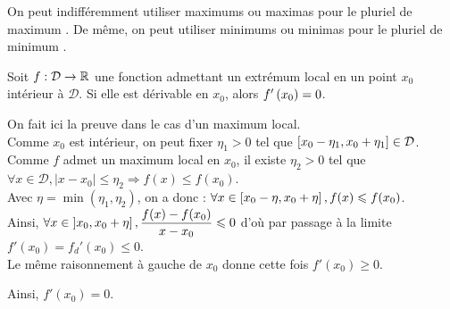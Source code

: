 \documentclass{magnolia}
\begin{document}
\begin{remarqueUnique}
\remarque On peut indifféremment utiliser \og maximums \fg ou \og maximas \fg
  pour le pluriel de \og maximum \fg. De même, on peut utiliser \og minimums \fg
  ou \og minimas \fg pour le pluriel de \og minimum \fg.
\end{remarqueUnique}

\begin{proposition}[utile=-3]
Soit $f:\mathcal{D}\to\mathbb{R}$ une fonction admettant un extrémum local en un point $x_0$ intérieur à
$\mathcal{D}$. Si elle est dérivable en $x_0$, alors $f'\left(x_0\right)=0$.
\end{proposition}

\begin{preuve}
On fait ici la preuve dans le cas d'un maximum local.\\
Comme $x_0$ est intérieur, on peut fixer $\eta_1>0$ tel que $\left[x_0-\eta_1,x_0+\eta_1\right] \in \mathcal{D}$. Comme $f$ admet un maximum local en $x_0$, il existe $\eta_2>0$ tel que $\forall x\in \mathcal{D}, |x-x_0|\leq \eta_2 \Longrightarrow f(x)\leq f(x_0)$.\\
Avec $\eta=\min(\eta_1,\eta_2)$, on a donc : $\forall x \in \left[x_0-\eta,x_0+\eta\right], f(x)\leqslant f(x_0)$.\\

Ainsi, $\forall x \in \left]x_0,x_0+\eta\right], \dfrac{f(x)-f(x_0)}{x-x_0}\leqslant 0$ d'où par passage à la limite $f'(x_0)=f_d'(x_0)\leq 0$.\\
Le même raisonnement à gauche de $x_0$ donne cette fois $f'(x_0)\geq 0$.

Ainsi, $f'(x_0)=0$.
\end{preuve}
\end{document}
